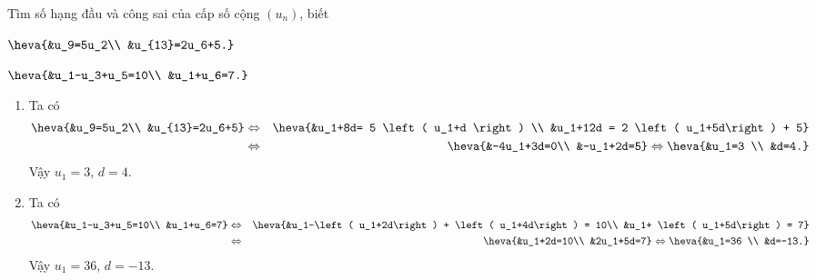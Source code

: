 \begin{vd}%
	Tìm số hạng đầu và công sai của cấp số cộng $(u_n)$, biết
		\begin{listEX}[2]
			\item $\heva{&u_9=5u_2\\ &u_{13}=2u_6+5.}$
			\item $\heva{&u_1-u_3+u_5=10\\ &u_1+u_6=7.}$
		\end{listEX}
	\loigiai
	{
		\begin{enumerate}
			\item Ta có
			\begin{eqnarray*}
				\heva{&u_9=5u_2\\ &u_{13}=2u_6+5} &\Leftrightarrow& \heva{&u_1+8d= 5 \left( u_1+d \right) \\ &u_1+12d = 2 \left( u_1+5d\right) + 5}\\
				&\Leftrightarrow& \heva{&-4u_1+3d=0\\ &-u_1+2d=5} \Leftrightarrow \heva{&u_1=3 \\ &d=4.}
			\end{eqnarray*}
			Vậy $u_1=3$, $d=4$.
			\item Ta có 
			\begin{eqnarray*}
				\heva{&u_1-u_3+u_5=10\\ &u_1+u_6=7} &\Leftrightarrow& \heva{&u_1-\left( u_1+2d\right) + \left( u_1+4d\right) = 10\\ &u_1+ \left( u_1+5d\right) = 7}\\
				&\Leftrightarrow& \heva{&u_1+2d=10\\ &2u_1+5d=7} \Leftrightarrow \heva{&u_1=36 \\ &d=-13.}
			\end{eqnarray*}
			Vậy $u_1=36$, $d=-13$.
		\end{enumerate}
	}
\end{vd}

